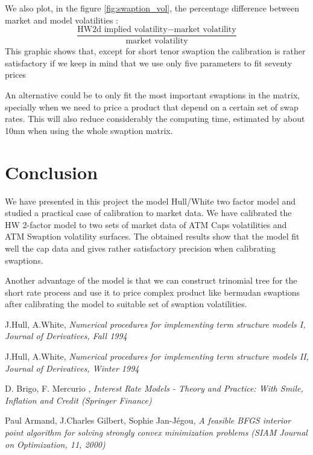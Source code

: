 \documentclass[12pt,a4paper]{article}
\begin{document}
We also plot, in the figure \ref{fig:swaption_vol}, the percentage difference between market and model volatilities :
$$
\dfrac{\text{HW2d implied volatility} - \text{market volatility}}{\text{market volatility}}
$$
This graphic shows that, except for short tenor swaption the calibration is rather satisfactory if we keep in mind that we use only five parameters to fit seventy prices

An alternative could be to only fit the most important swaptions in the matrix, specially when we need to price a product that depend on a certain set of swap rates. This will also reduce considerably the computing time, estimated by about 10mn when using the whole swaption matrix.


\newpage
\section{Conclusion}

We have presented in this project the model Hull/White two factor model and studied a practical case of calibration to market data. We have calibrated the HW 2-factor model to two sets of market data of ATM Caps volatilities and ATM Swaption volatility surfaces. The obtained results show that the model fit well the cap data and gives rather satisfactory precision when calibrating swaptions.

Another  advantage of the model is that we can construct trinomial tree for the short rate process and use it to price complex product like bermudan swaptions after calibrating the model to suitable set of swaption volatilities.


\newpage
\begin{thebibliography}{1}
 J.Hull, A.White, \textsl{Numerical procedures for implementing term structure models I, Journal of Derivatives, Fall 1994}

 J.Hull, A.White, \textsl{Numerical procedures for implementing term structure models II, Journal of Derivatives, Winter 1994}

  D. Brigo, F. Mercurio , \textsl{Interest Rate Models - Theory and Practice: With Smile, Inflation and Credit (Springer Finance)}

  Paul Armand,  J.Charles Gilbert, Sophie Jan-Jégou, \textsl{A feasible BFGS interior point algorithm for solving strongly convex minimization problems (SIAM Journal on Optimization, 11, 2000)}

\end{thebibliography}
\end{document}
